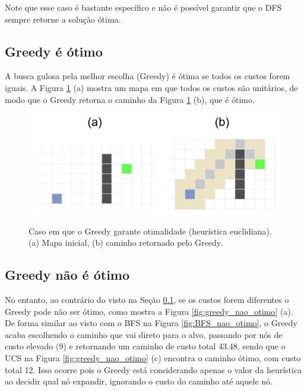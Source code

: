 \documentclass[letterpaper]{article} %
\begin{document}
Note que esse caso é bastante específico e não é possível garantir que o DFS
sempre retorne a solução ótima. 

\subsection{Greedy é ótimo}\label{sec:greedy_otimo}

A busca gulosa pela melhor escolha (Greedy) é ótima se todos os custos 
forem iguais. A Figura \ref{fig:greedy_otimo} (a) mostra um mapa em que
todos os custos são unitários, de modo que o Greedy retorna o caminho
da Figura \ref{fig:greedy_otimo} (b), que é ótimo.

\begin{figure}[htb]
	\centering 
    \caption{Caso em que o Greedy garante otimalidade (heurística euclidiana). (a) Mapa inicial, (b)
	caminho retornado pelo Greedy.}
	\includegraphics[width=\columnwidth]{images/greedy_otimo.png}
	\label{fig:greedy_otimo}
\end{figure}

\subsection{Greedy não é ótimo}

No entanto, ao contrário do visto na Seção \ref{sec:greedy_otimo},  
se os custos forem diferentes o Greedy pode não ser ótimo, como 
mostra a Figura \ref{fig:greedy_nao_otimo} (a). De forma similar ao visto com o BFS 
na Figura \ref{fig:BFS_nao_otimo}, o Greedy acaba escolhendo o caminho que vai direto para 
o alvo, passando por nós de custo elevado (9) e retornando um caminho de custo total 43.48, sendo que 
o UCS na Figura \ref{fig:greedy_nao_otimo} (c) encontra o caminho ótimo, com custo total 12.
Isso ocorre pois o Greedy está considerando apenas o valor da heurística ao decidir qual 
nó expandir, ignorando o custo do caminho até aquele nó.
\end{document}
